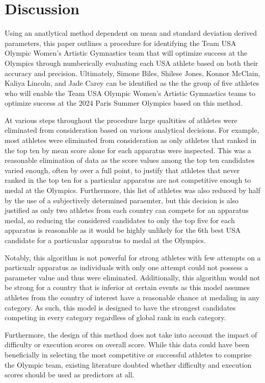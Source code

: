 \documentclass[12pt]{article}
\begin{document}
\section{Discussion}
\label{sec:dis}

Using an anatlytical method dependent on mean and standard deviation derived parameters, this paper 
outlines a procedure for identifying the Team USA Olympic Women’s Artistic Gymnastics team that will optimize 
success at the Olympics through numberically evaluating each USA athlete based on both their accuracy and precision. 
Ultimately, Simone Biles, Shilese Jones, Konnor McClain, Kaliya Lincoln, and Jade Carey can be identified as the 
the group of five athletes who will enable the Team USA Olympic Women’s Artistic Gymnastics teams to optimize 
success at the 2024 Paris Summer Olympics based on this method.

At various steps throughout the procedure large qualtities of athletes were eliminated from consideration 
based on various analytical decisions. For example, most athletes were eliminated from consideration as 
only athletes that ranked in the top ten by mean score alone for each apparatus were inspected. This was a 
reasonable elimination of data as the score values among the top ten candidates varied enough, often by over a 
full point, to justify that athletes that never ranked in the top ten for a particular apparatus are not 
competitive enough to medal at the Olympics. Furthermore, this list of athletes was also reduced by half by the 
use of a subjectively determined paraemter, but this decision is also justified as only two athletes from each 
country can compete for an apparatus medal, so reducing the considered candidates to only the top five for each 
apparatus is reasonable as it would be highly unlikely for the 6th best USA candidate for a particualar apparatus 
to medal at the Olympics.

Notably, this algorithm is not powerful for strong athletes with few attempts on a particualr apparatus as individuals 
with only one attempt could not possess a parameter value and thus were eliminated. Additionally, this algorithm 
would not be strong for a country that is inferior at certain events as this model assumes athletes from the country 
of interest have a reasonable chance at medaling in any category. As such, this model is designed to have the strongest 
candidates competing in every category regardless of global rank in each category.

Furthermore, the design of this method does not take into account the impact of difficulty or execution scores on 
overall score. While this data could have been beneficially in selecting the most competitive or successful athletes 
to comprise the Olympic team, existing literature doubted whether difficulty and execution scores should be 
used as predictors at all.
\end{document}
